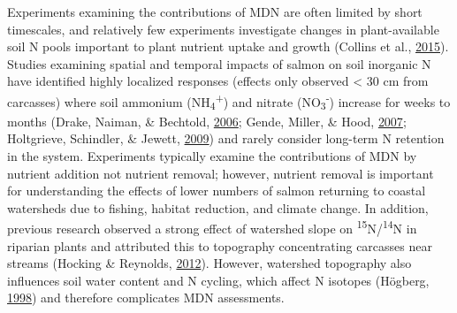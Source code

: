 \documentclass [11pt, proquest] {uwthesis}[2015/03/03]
\begin{document}
Experiments examining the contributions of MDN are often limited by
short timescales, and relatively few experiments investigate changes in
plant-available soil N pools important to plant nutrient uptake and
growth (Collins et al., \protect\hyperlink{ref-Collins2015}{2015}).
Studies examining spatial and temporal impacts of salmon on soil
inorganic N have identified highly localized responses (effects only
observed \textless{} 30 cm from carcasses) where soil ammonium
(NH\textsubscript{4}\textsuperscript{+}) and nitrate
(NO\textsubscript{3}\textsuperscript{-}) increase for weeks to months
(Drake, Naiman, \& Bechtold, \protect\hyperlink{ref-Drake2006}{2006};
Gende, Miller, \& Hood, \protect\hyperlink{ref-Gende2007}{2007};
Holtgrieve, Schindler, \& Jewett,
\protect\hyperlink{ref-Holtgrieve2009}{2009}) and rarely consider
long-term N retention in the system. Experiments typically examine the
contributions of MDN by nutrient addition not nutrient removal; however,
nutrient removal is important for understanding the effects of lower
numbers of salmon returning to coastal watersheds due to fishing,
habitat reduction, and climate change. In addition, previous research
observed a strong effect of watershed slope on
\textsuperscript{15}N/\textsuperscript{14}N in riparian plants and
attributed this to topography concentrating carcasses near streams
(Hocking \& Reynolds, \protect\hyperlink{ref-Hocking2012}{2012}).
However, watershed topography also influences soil water content and N
cycling, which affect N isotopes (Högberg,
\protect\hyperlink{ref-Hogberg1998}{1998}) and therefore complicates MDN
assessments.
\end{document}
